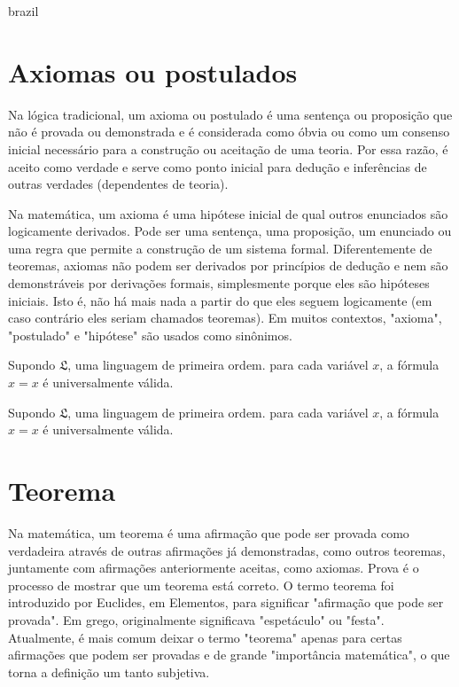 \begin{otherlanguage*}{brazil}



\section{Axiomas ou postulados}

Na lógica tradicional, um axioma ou postulado é uma sentença ou proposição que não é provada ou demonstrada e é considerada como óbvia ou como um consenso inicial necessário para a construção ou aceitação de uma teoria. Por essa razão, é aceito como verdade e serve como ponto inicial para dedução e inferências de outras verdades (dependentes de teoria).


Na matemática, um axioma é uma hipótese inicial de qual outros enunciados são logicamente derivados. Pode ser uma sentença, uma proposição, um enunciado ou uma regra que permite a construção de um sistema formal. Diferentemente de teoremas, axiomas não podem ser derivados por princípios de dedução e nem são demonstráveis por derivações formais, simplesmente porque eles são hipóteses iniciais. Isto é, não há mais nada a partir do que eles seguem logicamente (em caso contrário eles seriam chamados teoremas). Em muitos contextos, "axioma", "postulado" e "hipótese" são usados como sinônimos.


\begin{axioma}
Supondo $\mathfrak{L}$, uma linguagem de primeira ordem. para cada variável $x$, a fórmula $x = x$ é universalmente válida.
\end{axioma}


\begin{postulado}
    Supondo $\mathfrak{L}$, uma linguagem de primeira ordem. para cada variável $x$, a fórmula $x = x$ é universalmente válida.
\end{postulado}


\section{Teorema}


Na matemática, um teorema é uma afirmação que pode ser provada como verdadeira através de outras afirmações já demonstradas, como outros teoremas, juntamente com afirmações anteriormente aceitas, como axiomas. Prova é o processo de mostrar que um teorema está correto. O termo teorema foi introduzido por Euclides, em Elementos, para significar "afirmação que pode ser provada". Em grego, originalmente significava "espetáculo" ou "festa". Atualmente, é mais comum deixar o termo "teorema" apenas para certas afirmações que podem ser provadas e de grande "importância matemática", o que torna a definição um tanto subjetiva.


\end{otherlanguage*}
